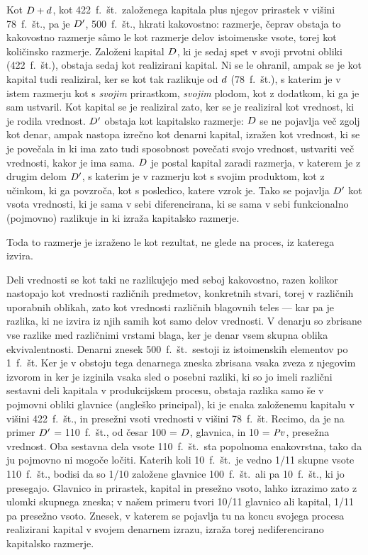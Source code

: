 \documentclass[kapital_02.tex]{subfiles}
\begin{document}
Kot \(D + d\), kot 422~f.~št.\ založenega kapitala plus njegov prirastek v višini 78~f.~št., pa je \(D'\), 500~f.~št., hkrati kakovostno: razmerje, čeprav obstaja to kakovostno razmerje s\^amo le kot razmerje delov istoimenske vsote, torej kot količinsko razmerje. Založeni kapital \(D\), ki je sedaj spet v svoji prvotni obliki (422~f.~št.), obstaja sedaj kot realizirani kapital. Ni se le ohranil, ampak se je kot kapital tudi realiziral, ker se kot tak razlikuje od \(d\) (78~f.~št.), s katerim je v istem razmerju kot s \emph{svojim} prirastkom, \emph{svojim} plodom, kot z dodatkom, ki ga je sam ustvaril. Kot kapital se je realiziral zato, ker se je realiziral kot vrednost, ki je rodila vrednost. \(D'\) obstaja kot kapitalsko razmerje: \(D\) se ne pojavlja več zgolj kot denar, ampak nastopa izrečno kot denarni kapital, izražen kot vrednost, ki se je povečala in ki ima zato tudi sposobnost povečati svojo vrednost, ustvariti več vrednosti, kakor je ima sama. \(D\) je postal kapital zaradi razmerja, v katerem je z drugim delom \(D'\), s katerim je v razmerju kot s svojim produktom, kot z učinkom, ki ga povzroča, kot s posledico, katere vzrok je. Tako se pojavlja \(D'\) kot vsota vrednosti, ki je sama v sebi diferencirana, ki se sama v sebi funkcionalno (pojmovno) razlikuje in ki izraža kapitalsko razmerje.

Toda to razmerje je izraženo le kot rezultat, ne glede na proces, iz katerega izvira.

Deli vrednosti se kot taki ne razlikujejo med seboj kakovostno, razen kolikor nastopajo kot vrednosti različnih predmetov, konkretnih stvari, torej v različnih uporabnih oblikah, zato kot vrednosti različnih blagovnih teles --- kar pa je razlika, ki ne izvira iz njih samih kot samo delov vrednosti. V denarju so zbrisane vse razlike med različnimi vrstami blaga, ker je denar vsem skupna oblika ekvivalentnosti. Denarni znesek 500~f.~št.\ sestoji iz istoimenskih elementov po 1~f.~št. Ker je v obstoju tega denarnega zneska zbrisana vsaka zveza z njegovim izvorom in ker je izginila vsaka sled o posebni razliki, ki so jo imeli različni sestavni deli kapitala v produkcijskem procesu, obstaja razlika samo še v pojmovni obliki glavnice (angleško principal), ki je enaka založenemu kapitalu v višini 422~f.~št., in presežni vsoti vrednosti v višini 78~f.~št. Recimo, da je na primer \(D'\) = 110~f.~št., od česar 100 = \(D\), glavnica, in 10 = \(\mathit{Pv}\), presežna vrednost. Oba sestavna dela vsote 110~f.~št.\ sta popolnoma enakovrstna, tako da ju pojmovno ni mogoče ločiti. Katerih koli 10~f.~št.\ je vedno 1/11 skupne vsote 110~f.~št., bodisi da so 1/10 založene glavnice 100~f.~št.\ ali pa 10~f.~št., ki jo presegajo. Glavnico in prirastek, kapital in presežno vsoto, lahko izrazimo zato z ulomki skupnega zneska; v našem primeru tvori 10/11 glavnico ali kapital, 1/11 pa presežno vsoto. Znesek, v katerem se pojavlja tu na koncu svojega procesa realizirani kapital v svojem denarnem izrazu, izraža torej nediferencirano kapitalsko razmerje.
\end{document}
